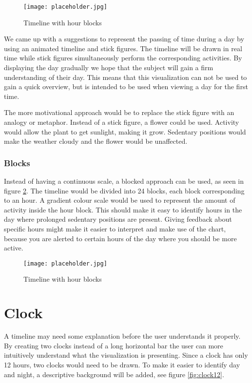 \begin{figure}[h!]
	\centering
		\texttt{[image: placeholder.jpg]}
		\caption{\footnotesize Timeline with hour blocks}
		\label{fig:timelineContinuous}
\end{figure}
We came up with a suggestions to represent the passing of time during a day by using an animated timeline and stick figures. The timeline will be drawn in real time while stick figures simultaneously perform the corresponding activities. By displaying the day gradually we hope that the subject will gain a firm understanding of their day. This means that this visualization can not be used to gain a quick overview, but is intended to be used when viewing a day for the first time.

The more motivational approach would be to replace the stick figure with an analogy or metaphor. Instead of a stick figure, a flower could be used. Activity would allow the plant to get sunlight, making it grow. Sedentary positions would make the weather cloudy and the flower would be unaffected.

\subsubsection{Blocks}
Instead of having a continuous scale, a blocked approach can be used, as seen in figure \ref{fig:timelineBlocks}. The timeline would be divided into 24 blocks, each block corresponding to an hour. A gradient colour scale would be used to represent the amount of activity inside the hour block. This should make it easy to identify hours in the day where prolonged sedentary positions are present. Giving feedback about specific hours might make it easier to interpret and make use of the chart, because you are alerted to certain hours of the day where you should be more active.

\begin{figure}[h!]
	\centering
		\texttt{[image: placeholder.jpg]}
		\caption{\footnotesize Timeline with hour blocks}
		\label{fig:timelineBlocks}
\end{figure}

\section{Clock}
A timeline may need some explanation before the user understands it properly. By creating two clocks instead of a long horizontal bar the user can more intuitively understand what the visualization is presenting. Since a clock has only 12 hours, two clocks would need to be drawn. To make it easier to identify day and night, a descriptive background will be added, see figure \ref{fig:clock12}.

